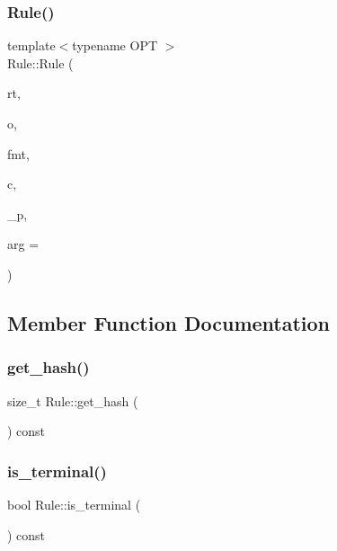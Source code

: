 \subsubsection{\texorpdfstring{Rule()}{Rule()}}
{\footnotesize\ttfamily template$<$typename O\+PT $>$ \\
Rule\+::\+Rule (\begin{DoxyParamCaption}\item[{const \hyperlink{_nonterminal_8h_a5c1f658dc7560600a16d22408bd716ca}{nonterminal\+\_\+t}}]{rt,  }\item[{const O\+PT}]{o,  }\item[{const std\+::string}]{fmt,  }\item[{std\+::initializer\+\_\+list$<$ \hyperlink{_nonterminal_8h_a5c1f658dc7560600a16d22408bd716ca}{nonterminal\+\_\+t} $>$}]{c,  }\item[{double}]{\+\_\+p,  }\item[{const int}]{arg = {} }\end{DoxyParamCaption})\hspace{0.3cm}{\ttfamily [inline]}}



\subsection{Member Function Documentation}
\mbox{\label{class_rule_a62e4d931266a65d4aad9ca3c058d7e25}} 
\subsubsection{\texorpdfstring{get\+\_\+hash()}{get\_hash()}}
{\footnotesize\ttfamily size\+\_\+t Rule\+::get\+\_\+hash (\begin{DoxyParamCaption}{ }\end{DoxyParamCaption}) const\hspace{0.3cm}{\ttfamily [inline]}}

\mbox{\label{class_rule_a9d557e302f94bd85f5505733e8856f97}} 
\subsubsection{\texorpdfstring{is\+\_\+terminal()}{is\_terminal()}}
{\footnotesize\ttfamily bool Rule\+::is\+\_\+terminal (\begin{DoxyParamCaption}{ }\end{DoxyParamCaption}) const\hspace{0.3cm}{\ttfamily [inline]}}

